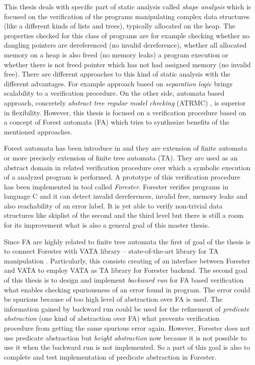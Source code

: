 This thesis deals with specific part of static analysis called \emph{shape analysis} which is focused on the verification of the programs manipulating
complex data structures (like a different kinds of lists and trees), typically allocated on the heap.
The properties checked for this class of programs are for example checking whether no dangling
pointers are dereferenced (no invalid dereference), whether all allocated memory on a heap is also freed (no memory leaks)
a program execution or whether there is not freed pointer which has not had assigned memory (no invalid free).
There are different approaches to this kind of static analysis with the different advantages.
For example approach based on \emph{separation logic} \cite{seplog,seplog07} brings scalability to a verification procedure.
On the other side, automata based approach, concretely \emph{abstract tree regular model checking} (ATRMC) \cite{artmc}, is
superior in flexibility.
However, this thesis is focused on a verification procedure based on a concept of Forest automata (FA) which tries
to synthesize benefits of the mentioned approaches.

Forest automata has been introduce in \cite{forester11,forester12} and they are extension of finite automata or more precisely extension of finite tree automata (TA).
They are used as an abstract domain in related verification procedure over which a symbolic execution of a analyzed program is performed.
A prototype of this verification procedure has been implemented in tool called \emph{Forester}.
Forester verifies programs in language C and it can detect invalid dereferences, invalid free, memory leaks and also reachability of an error label.
It is yet able to verify non-trivial data structures like skiplist of the second and the third level
but there is still a room for its improvement what is also a general goal of this master thesis.

Since FA are highly related to finite tree automata the first of goal of the thesis is to connect
Forester with VATA library -- state-of-the-art library for TA manipulation \cite{libvata}.
Particularly, this consists creating of an interface between Forester and VATA to employ VATA as TA library for Forester backend.
The second goal of this thesis is to design and implement \emph{backward run} for FA based verification what enables checking spuriousness of an error found in program.
The error could be spurious because of too high level of abstraction over FA is used.
The information gained by backward run could be used for the refinement of \emph{predicate abstraction} (one kind of abstraction over FA)
what prevents verification procedure from getting the same spurious error again.
However, Forester does not use predicate abstraction but \emph{height abstraction} now because it is not possible to use it when the backward run is not implemented.
So a part of this goal is also to complete and test implementation of predicate abstraction in Forester.

